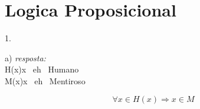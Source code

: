 \documentclass[a4paper, 12pt]{article}
\begin{document}
	\parskip=12pt
	\section{Logica Proposicional}
	\parskip=4pt 1.
	\par
	a) \emph{resposta:}\\
	\to H(x)\colon x \ eh \ Humano\\
	\to M(x)\colon x \ eh \ Mentiroso
	
	\begin{center}
	\begin{displaymath}
	\forall{x} \in H(x) \Longrightarrow x \in M
	\end{displaymath}
	\end{center}
	
\end{document}
